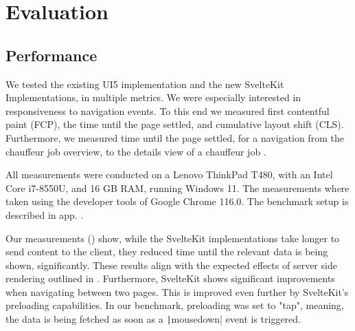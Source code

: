 \chapter{Evaluation}
\label{ch:evaluation}


\section{Performance}


We tested the existing UI5 implementation and the new SvelteKit Implementations, in multiple metrics. We were especially interested in responsiveness to navigation events. To this end we measured first contentful paint (FCP), the time until the page settled, and cumulative layout shift (CLS). Furthermore, we measured time until the page settled, for a navigation from the chauffeur job overview, to the details view of a chauffeur job .

All measurements were conducted on a Lenovo ThinkPad T480, with an Intel Core i7-8550U, and 16 GB RAM, running Windows 11. The measurements where taken using the developer tools of Google Chrome 116.0. The benchmark setup is described in app. .

Our measurements () show, while the SvelteKit implementations take longer to send content to the client, they reduced time until the relevant data is being shown, significantly. These results align with the expected effects of server side rendering outlined in . Furthermore, SvelteKit shows significant improvements when navigating between two pages. This is improved even further by SvelteKit's preloading capabilities. In our benchmark, preloading was set to "tap", meaning, the data is being fetched as soon as a \texttt|mousedown| event is triggered.  

